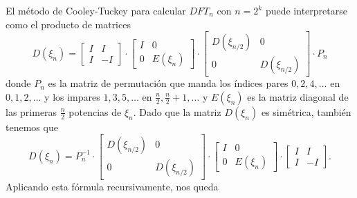\documentclass[a4paper, 11pt]{article}
\theoremstyle{plain}
\theoremstyle{definition}
\begin{document}
El método de Cooley-Tuckey para calcular $DFT_n$ con $n=2^k$ puede interpretarse
como el producto de matrices
\[
  D(\xi_n) = \left[\begin{array}{cc}I & I \\ I & -I\end{array}\right]\cdot
  \left[\begin{array}{cc}I & 0 \\ 0 & E(\xi_n)\end{array}\right]\cdot
  \left[\begin{array}{cc}D(\xi_{n/2}) & 0 \\ 0 & D(\xi_{n/2})\end{array}\right]\cdot
  P_n
\]
donde $P_n$ es la matriz de permutación que manda los índices pares $0,2,4,\ldots$
en $0,1,2,\ldots$ y los impares $1,3,5,\ldots$ en $\frac{n}2,\frac{n}2+1,\ldots$ y
$E(\xi_n)$ es la matriz diagonal de las primeras $\frac{n}2$ potencias de $\xi_n$.
Dado que la matriz $D(\xi_n)$ es simétrica, también tenemos que
\[
D(\xi_n) = P_n^{-1}\cdot
\left[\begin{array}{cc}D(\xi_{n/2}) & 0 \\ 0 & D(\xi_{n/2})\end{array}\right]\cdot
\left[\begin{array}{cc}I & 0 \\ 0 & E(\xi_n)\end{array}\right]\cdot
\left[\begin{array}{cc}I & I \\ I & -I\end{array}\right].
\]
Aplicando esta fórmula recursivamente, nos queda
\end{document}
